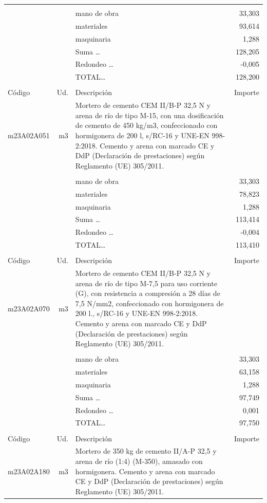 \begin{supertabular}{l r p{60mm} r}
&&&\\%
&&mano de obra&    33,303\\%
&&materiales&    93,614\\%
&&maquinaria&     1,288\\%
&&Suma \ldots&   128,205\\%
&&Redondeo \ldots&    {-}0,005\\%
%
&&TOTAL\ldots&   128,200\\%
&&&\\%
Código&Ud.&Descripción&Importe\\%
\hline%
m23A02A051&m3&Mortero de cemento CEM II/B{-}P 32,5 N y arena de río de tipo M{-}15, con una dosificación de cemento de 450 kg/m3, confeccionado con hormigonera de 200 l, s/RC{-}16 y UNE{-}EN 998{-}2:2018. Cemento y arena con marcado CE y DdP (Declaración de prestaciones) según Reglamento (UE) 305/2011.&\\%
&&&\\%
&&mano de obra&    33,303\\%
&&materiales&    78,823\\%
&&maquinaria&     1,288\\%
&&Suma \ldots&   113,414\\%
&&Redondeo \ldots&    {-}0,004\\%
%
&&TOTAL\ldots&   113,410\\%
&&&\\%
Código&Ud.&Descripción&Importe\\%
\hline%
m23A02A070&m3&Mortero de cemento CEM II/B{-}P 32,5 N y arena de río de tipo M{-}7,5 para uso corriente (G), con resistencia a compresión a 28 días de 7,5 N/mm2, confeccionado con hormigonera de 200 l., s/RC{-}16 y UNE{-}EN 998{-}2:2018. Cemento y arena con marcado CE y DdP (Declaración de prestaciones) según Reglamento (UE) 305/2011.&\\%
&&&\\%
&&mano de obra&    33,303\\%
&&materiales&    63,158\\%
&&maquinaria&     1,288\\%
&&Suma \ldots&    97,749\\%
&&Redondeo \ldots&     0,001\\%
%
&&TOTAL\ldots&    97,750\\%
&&&\\%
Código&Ud.&Descripción&Importe\\%
\hline%
m23A02A180&m3&Mortero de 350 kg de cemento II/A{-}P 32,5 y arena de río (1:4) (M{-}350), amasado con hormigonera. Cemento y arena con marcado CE y DdP (Declaración de prestaciones) según Reglamento (UE) 305/2011.&\\%

\end{supertabular}
